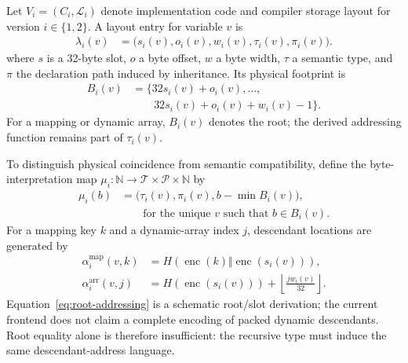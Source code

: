 \documentclass[runningheads]{llncs}
\begin{document}
Let \(V_i=(C_i,\mathcal L_i)\) denote implementation code and compiler storage layout for version \(i\in\{1,2\}\).  A layout entry for variable \(v\) is
\begin{equation}
\begin{aligned}
\lambda_i(v)&=\bigl(s_i(v),o_i(v),w_i(v),\tau_i(v),\pi_i(v)\bigr).
\end{aligned}
\label{eq:cell}
\end{equation}
where \(s\) is a 32-byte slot, \(o\) a byte offset, \(w\) a byte width, \(\tau\) a semantic type, and \(\pi\) the declaration path induced by inheritance.  Its physical footprint is
\begin{equation}
\begin{aligned}
B_i(v)&=\{32s_i(v)+o_i(v),\ldots,\\
&\qquad 32s_i(v)+o_i(v)+w_i(v)-1\}.
\end{aligned}
\label{eq:footprint}
\end{equation}
For a mapping or dynamic array, \(B_i(v)\) denotes the root; the derived addressing function remains part of \(\tau_i(v)\).

To distinguish physical coincidence from semantic compatibility, define the byte-interpretation map \(\mu_i:\mathbb{N}\rightarrow\mathcal{T}\times\mathcal{P}\times\mathbb{N}\) by
\begin{equation}
\begin{aligned}
\mu_i(b)&=\bigl(\tau_i(v),\pi_i(v),b-\min B_i(v)\bigr),\\
&\qquad\text{for the unique }v\text{ such that }b\in B_i(v).
\end{aligned}
\label{eq:byte-interpretation}
\end{equation}
For a mapping key \(k\) and a dynamic-array index \(j\), descendant locations are generated by
\begin{equation}
\begin{aligned}
\alpha_i^{\mathrm{map}}(v,k)
&=H(\operatorname{enc}(k)\Vert\operatorname{enc}(s_i(v))),\\
\alpha_i^{\mathrm{arr}}(v,j)
&=H(\operatorname{enc}(s_i(v)))
  +\left\lfloor\frac{jw_i(v)}{32}\right\rfloor .
\end{aligned}
\label{eq:root-addressing}
\end{equation}
Equation~\eqref{eq:root-addressing} is a schematic root/slot derivation; the current frontend does not claim a complete encoding of packed dynamic descendants.  Root equality alone is therefore insufficient: the recursive type must induce the same descendant-address language.
\end{document}
